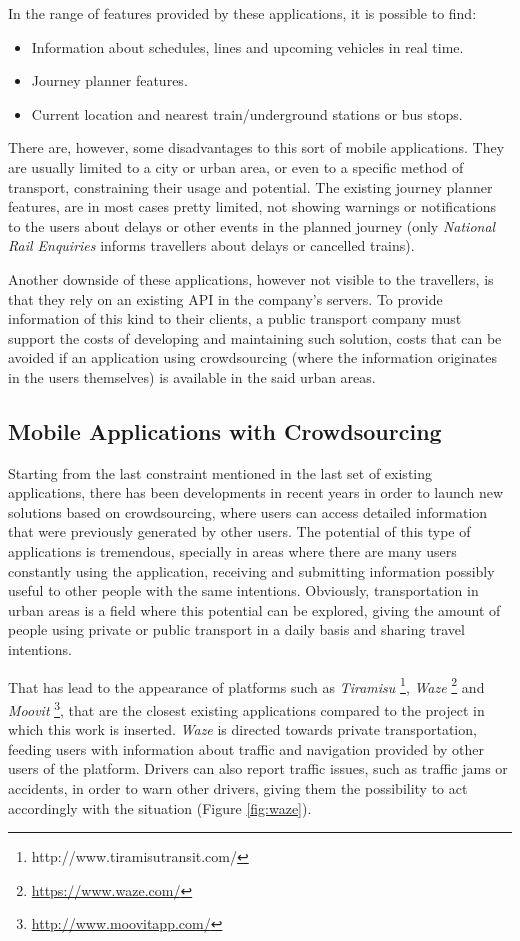 In the range of features provided by these applications, it is possible to find: 

\begin{itemize}
\item Information about schedules, lines and upcoming vehicles in real time.
\item Journey planner features.
\item Current location and nearest train/underground stations or bus stops.
\end{itemize}

There are, however, some disadvantages to this sort of mobile applications. They are usually limited to a city or urban area, or even to a specific method of transport, constraining their usage and potential.
The existing journey planner features, are in most cases pretty limited, not showing warnings or notifications to the users about delays or other events in the planned journey (only \emph{National Rail Enquiries} informs travellers about delays or cancelled trains).

Another downside of these applications, however not visible to the travellers, is that they rely on an existing API in the company's servers. To provide information of this kind to their clients, a public transport company must support the costs of developing and maintaining such solution, costs that can be avoided if an application using crowdsourcing (where the information originates in the users themselves) is available in the said urban areas.

\subsection{Mobile Applications with Crowdsourcing}

Starting from the last constraint mentioned in the last set of existing applications, there has been developments in recent years in order to launch new solutions based on crowdsourcing, where users can access detailed information that were previously generated by other users. The potential of this type of applications is tremendous, specially in areas where there are many users  constantly using the application, receiving and submitting information possibly useful to other people with the same intentions. 
Obviously, transportation in urban areas is a field where this potential can be explored, giving the amount of people using private or public transport in a daily basis and sharing travel intentions.

That has lead to the appearance of platforms such as \emph{Tiramisu} \footnote{http://www.tiramisutransit.com/}, \emph{Waze} \footnote{\url{https://www.waze.com/}} and \emph{Moovit} \footnote{\url{http://www.moovitapp.com/}},  that are the closest existing applications compared to the project in which this work is inserted.
\emph{Waze} is directed towards private transportation, feeding users with information about traffic and navigation provided by other users of the platform. Drivers can also report traffic issues, such as traffic jams or accidents, in order to warn other drivers, giving them the possibility to act accordingly with the situation (Figure \ref{fig:waze}).

